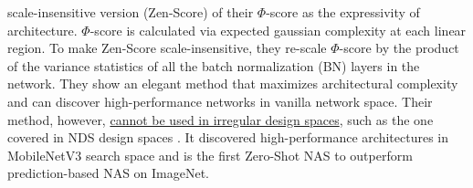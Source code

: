 \documentclass[lettersize,journal]{IEEEtran}
\begin{document}
scale-insensitive version (Zen-Score) of their $\Phi$-score as the expressivity of architecture. $\Phi$-score is calculated via expected gaussian complexity at each linear region. To make Zen-Score scale-insensitive, they re-scale $\Phi$-score by the product of the variance statistics of all the batch normalization (BN) layers in the network. They show an elegant method that maximizes architectural complexity and can discover high-performance networks in vanilla network space. Their method, however, \underline{cannot be used in irregular design spaces}, such as the one covered in NDS design spaces \cite{nds}. It discovered high-performance architectures in MobileNetV3 \cite{Mobilenetv3} search space and is the first Zero-Shot NAS to outperform prediction-based NAS on ImageNet.
\end{document}
